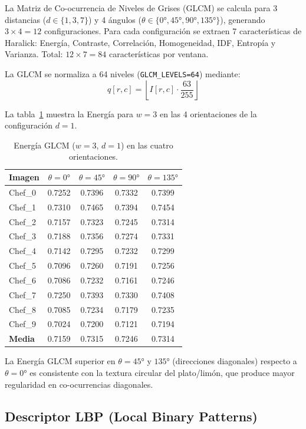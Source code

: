 \documentclass[12pt,a4paper]{article}
\begin{document}
La Matriz de Co-ocurrencia de Niveles de Grises (GLCM) se calcula
para 3 distancias ($d \in \{1,3,7\}$) y 4 ángulos
($\theta \in \{0°, 45°, 90°, 135°\}$), generando $3 \times 4 = 12$
configuraciones.  Para cada configuración se extraen 7 características
de Haralick: Energía, Contraste, Correlación, Homogeneidad, IDF,
Entropía y Varianza.  Total: $12 \times 7 = 84$ características por
ventana.

La GLCM se normaliza a 64 niveles (\texttt{GLCM\_LEVELS=64}) mediante:
\[
  q[r,c] = \left\lfloor I[r,c] \cdot \frac{63}{255} \right\rfloor
\]

La tabla~\ref{tab:glcm_w3} muestra la Energía para $w=3$ en las 4
orientaciones de la configuración $d=1$.

\begin{table}[H]
\centering
\caption{Energía GLCM ($w=3$, $d=1$) en las cuatro orientaciones.}
\label{tab:glcm_w3}
\setlength{\tabcolsep}{5pt}
\begin{tabular}{@{}lcccc@{}}
\toprule
\textbf{Imagen} & $\theta=0°$ & $\theta=45°$ & $\theta=90°$ & $\theta=135°$ \\
\midrule
Chef\_0 & 0.7252 & 0.7396 & 0.7332 & 0.7399 \\
Chef\_1 & 0.7310 & 0.7465 & 0.7394 & 0.7454 \\
Chef\_2 & 0.7157 & 0.7323 & 0.7245 & 0.7314 \\
Chef\_3 & 0.7188 & 0.7356 & 0.7274 & 0.7331 \\
Chef\_4 & 0.7142 & 0.7295 & 0.7232 & 0.7299 \\
Chef\_5 & 0.7096 & 0.7260 & 0.7191 & 0.7256 \\
Chef\_6 & 0.7086 & 0.7232 & 0.7161 & 0.7246 \\
Chef\_7 & 0.7250 & 0.7393 & 0.7330 & 0.7408 \\
Chef\_8 & 0.7085 & 0.7234 & 0.7179 & 0.7235 \\
Chef\_9 & 0.7024 & 0.7200 & 0.7121 & 0.7194 \\
\midrule
\textbf{Media} & 0.7159 & 0.7315 & 0.7246 & 0.7314 \\
\bottomrule
\end{tabular}
\end{table}

\noindent La Energía GLCM superior en $\theta=45°$ y $135°$ (direcciones
diagonales) respecto a $\theta=0°$ es consistente con la textura
circular del plato/limón, que produce mayor regularidad en co-ocurrencias
diagonales.

\subsection{Descriptor LBP (Local Binary Patterns)}
\end{document}
